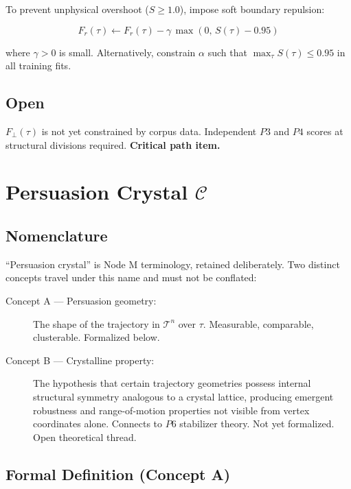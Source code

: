 \documentclass{article}
\begin{document}
To prevent unphysical overshoot ($S \geq 1.0$), impose soft
boundary repulsion:

\begin{equation}
F_r(\tau) \leftarrow F_r(\tau) -
  \gamma\,\max(0,\, S(\tau) - 0.95)
\end{equation}

where $\gamma > 0$ is small. Alternatively, constrain $\alpha$
such that $\max_\tau S(\tau) \leq 0.95$ in all training fits.

\subsection*{Open}

$F_\perp(\tau)$ is not yet constrained by corpus data.
Independent $P3$ and $P4$ scores at structural divisions required.
\textbf{Critical path item.}

\section{Persuasion Crystal $\mathcal{C}$}

\subsection*{Nomenclature}

``Persuasion crystal'' is Node M terminology, retained deliberately.
Two distinct concepts travel under this name and must not be conflated:

\begin{description}
  \item[Concept A --- Persuasion geometry:]
    The shape of the trajectory in $\mathcal{T}^n$ over $\tau$.
    Measurable, comparable, clusterable. Formalized below.
  \item[Concept B --- Crystalline property:]
    The hypothesis that certain trajectory geometries possess internal
    structural symmetry analogous to a crystal lattice, producing
    emergent robustness and range-of-motion properties not visible
    from vertex coordinates alone. Connects to $P6$ stabilizer theory.
    Not yet formalized. Open theoretical thread.
\end{description}

\subsection*{Formal Definition (Concept A)}
\end{document}
